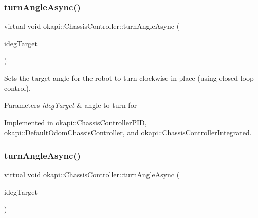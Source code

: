 \mbox{\label{classokapi_1_1ChassisController_a87fc1f88bf06340d8f022a8c185b5e87}} 
\subsubsection{\texorpdfstring{turnAngleAsync()}{turnAngleAsync()}\hspace{0.1cm}{\footnotesize\ttfamily [1/2]}}
{\footnotesize\ttfamily virtual void okapi\+::\+Chassis\+Controller\+::turn\+Angle\+Async (\begin{DoxyParamCaption}\item[{Q\+Angle}]{ideg\+Target }\end{DoxyParamCaption})\hspace{0.3cm}{\ttfamily [pure virtual]}}

Sets the target angle for the robot to turn clockwise in place (using closed-\/loop control).


\begin{DoxyParams}{Parameters}
{\em ideg\+Target} & angle to turn for \\
\hline
\end{DoxyParams}


Implemented in \mbox{\hyperlink{classokapi_1_1ChassisControllerPID_a391c12c7b3cb5461cd28c4aebc4aeab0}{okapi\+::\+Chassis\+Controller\+P\+ID}}, \mbox{\hyperlink{classokapi_1_1DefaultOdomChassisController_a18d748097a7938e3102638d17be54c76}{okapi\+::\+Default\+Odom\+Chassis\+Controller}}, and \mbox{\hyperlink{classokapi_1_1ChassisControllerIntegrated_a773a99fe7a1540da856ad6b6008ba24f}{okapi\+::\+Chassis\+Controller\+Integrated}}.

\mbox{\label{classokapi_1_1ChassisController_a35cadd99478629637b4bd3a5e709871a}} 
\subsubsection{\texorpdfstring{turnAngleAsync()}{turnAngleAsync()}\hspace{0.1cm}{\footnotesize\ttfamily [2/2]}}
{\footnotesize\ttfamily virtual void okapi\+::\+Chassis\+Controller\+::turn\+Angle\+Async (\begin{DoxyParamCaption}\item[{double}]{ideg\+Target }\end{DoxyParamCaption})\hspace{0.3cm}{\ttfamily [pure virtual]}}

